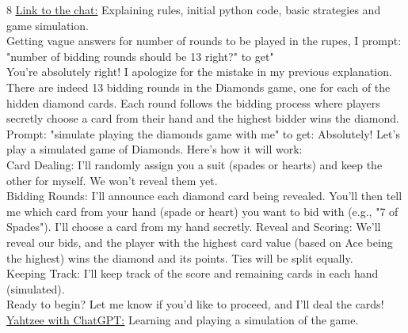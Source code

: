 \documentclass[runningheads]{llncs}
\begin{document}
\begin{thebibliography}{8}
\underline{\href{https://g.co/gemini/share/738320f7e8a6}{Link to the chat:}} Explaining rules, initial python code, basic strategies and game simulation.\\

 Getting vague answers for number of rounds to be played in the rupes, I prompt: "number of bidding rounds should be 13 right?" to get"\\
You're absolutely right! I apologize for the mistake in my previous explanation. There are indeed 13 bidding rounds in the Diamonds game, one for each of the hidden diamond cards. Each round follows the bidding process where players secretly choose a card from their hand and the highest bidder wins the diamond.\\

 Prompt: "simulate playing the diamonds game with me" to get:
Absolutely! Let's play a simulated game of Diamonds. Here's how it will work:\\

Card Dealing: I'll randomly assign you a suit (spades or hearts) and keep the other for myself. We won't reveal them yet.\\
Bidding Rounds: I'll announce each diamond card being revealed. You'll then tell me which card from your hand (spade or heart) you want to bid with (e.g., "7 of Spades"). I'll choose a card from my hand secretly.
Reveal and Scoring: We'll reveal our bids, and the player with the highest card value (based on Ace being the highest) wins the diamond and its points. Ties will be split equally.\\
Keeping Track: I'll keep track of the score and remaining cards in each hand (simulated).\\
Ready to begin? Let me know if you'd like to proceed, and I'll deal the cards!\\

\underline{\href{https://chat.openai.com/share/949b3337-f29f-49c7-82a3-78c4bf30ee25}{Yahtzee with ChatGPT:}} Learning and playing a simulation of the game.


\end{thebibliography}
\end{document}
